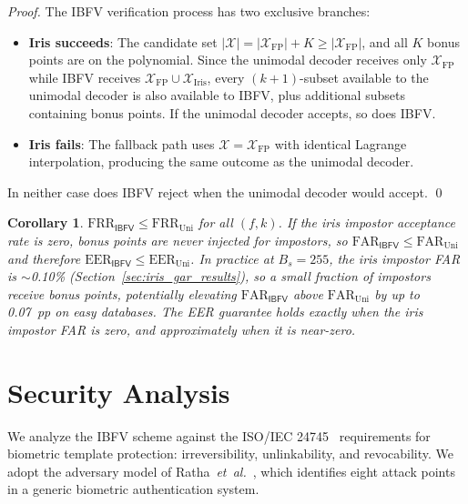 \documentclass[conference]{IEEEtran}
\newtheorem{corollary}{Corollary}
\newcommand{\IBFV}{\textsf{IBFV}}
\newcommand{\EER}{\mathrm{EER}}
\newcommand{\FAR}{\mathrm{FAR}}
\newcommand{\FRR}{\mathrm{FRR}}
\begin{document}
\begin{proof}
The \IBFV{} verification process has two exclusive branches:
\begin{itemize}
    \item \textbf{Iris succeeds}: The candidate set $|\mathcal{X}| = |\mathcal{X}_{\text{FP}}| + K \geq |\mathcal{X}_{\text{FP}}|$, and all $K$ bonus points are on the polynomial. Since the unimodal decoder receives only $\mathcal{X}_{\text{FP}}$ while \IBFV{} receives $\mathcal{X}_{\text{FP}} \cup \mathcal{X}_{\text{Iris}}$, every $(k{+}1)$-subset available to the unimodal decoder is also available to \IBFV{}, plus additional subsets containing bonus points. If the unimodal decoder accepts, so does \IBFV{}.
    \item \textbf{Iris fails}: The fallback path uses $\mathcal{X} = \mathcal{X}_{\text{FP}}$ with identical Lagrange interpolation, producing the same outcome as the unimodal decoder.
\end{itemize}
In neither case does \IBFV{} reject when the unimodal decoder would accept. \qed
\end{proof}

\begin{corollary}
$\FRR_{\IBFV} \leq \FRR_{\text{Uni}}$ for all $(f,k)$. If the iris impostor acceptance rate is zero, bonus points are never injected for impostors, so $\FAR_{\IBFV} \leq \FAR_{\text{Uni}}$ and therefore $\EER_{\IBFV} \leq \EER_{\text{Uni}}$. In practice at $B_s = 255$, the iris impostor FAR is $\sim$0.10\% (Section~\ref{sec:iris_gar_results}), so a small fraction of impostors receive bonus points, potentially elevating $\FAR_{\IBFV}$ above $\FAR_{\text{Uni}}$ by up to 0.07~pp on easy databases. The EER guarantee holds exactly when the iris impostor FAR is zero, and approximately when it is near-zero.
\end{corollary}

\section{Security Analysis}
\label{sec:security}

We analyze the \IBFV{} scheme against the ISO/IEC 24745~\cite{iso24745} requirements for biometric template protection: irreversibility, unlinkability, and revocability. We adopt the adversary model of Ratha~\textit{et~al.}~\cite{ratha2001enhancing}, which identifies eight attack points in a generic biometric authentication system.
\end{document}
